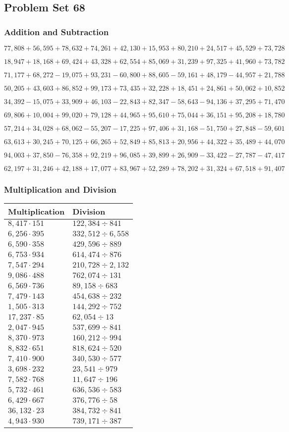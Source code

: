 \hypertarget{problem-set-68}{%
\subsection{Problem Set 68}\label{problem-set-68}}

\hypertarget{addition-and-subtraction-290}{%
\subsubsection{Addition and
Subtraction}\label{addition-and-subtraction-290}}

\(77,808+56,595+78,632+74,261+42,130+15,953+80,210+24,517+45,529+ 73,728\)

\(18,947+18,168+69,424+43,328+62,554+85,069+31,239+97,325+41,960+73,782\)

\(71,177+68,272-19,075+93,231-60,800+88,605-59,161+48,179-44,957+21,788\)

\(50,205+43,603+86,852+99,173+73,435+32,228+18,451+24,861+50,062+10,852\)

\(34,392-15,075+33,909+46,103-22,843+82,347-58,643-94,136+37,295+71,470\)

\(69,806+10,004+99,020+79,128+44,965+95,610+75,044+36,151+95,208+18,780\)

\(57,214+34,028+68,062-55,207-17,225+97,406+31,168-51,750+27,848-59,601\)

\(63,613+30,245+70,125+66,265+52,849+85,813+20,956+44,322+35,489+44,070\)

\(94,003+37,850-76,358+92,219+96,085+39,899+26,909-33,422-27,787-47,417\)

\(62,197+31,246+42,188+17,077+83,967+52,289+78,202+31,324+67,518+91,407\)

\hypertarget{multiplication-and-division-289}{%
\subsubsection{Multiplication and
Division}\label{multiplication-and-division-289}}

\begin{longtable}[]{@{}ll@{}}
\toprule
Multiplication & Division\tabularnewline
\midrule
\endhead
\(8,417\cdot151\) & \(122,384÷841\)\tabularnewline
\(6,256\cdot395\) & \(332,512÷6,558\)\tabularnewline
\(6,590\cdot358\) & \(429,596÷889\)\tabularnewline
\(6,753\cdot934\) & \(614,474÷876\)\tabularnewline
\(7,547\cdot294\) & \(210,728÷2,132\)\tabularnewline
\(9,086\cdot488\) & \(762,074÷131\)\tabularnewline
\(6,569\cdot736\) & \(89,158÷683\)\tabularnewline
\(7,479\cdot143\) & \(454,638÷232\)\tabularnewline
\(1,505\cdot313\) & \(144,292÷752\)\tabularnewline
\(17,237\cdot85\) & \(62,054÷13\)\tabularnewline
\(2,047\cdot945\) & \(537,699÷841\)\tabularnewline
\(8,370\cdot973\) & \(160,212÷994\)\tabularnewline
\(8,832\cdot651\) & \(818,624÷520\)\tabularnewline
\(7,410\cdot900\) & \(340,530÷577\)\tabularnewline
\(3,698\cdot232\) & \(23,541÷979\)\tabularnewline
\(7,582\cdot768\) & \(11,647÷196\)\tabularnewline
\(5,732\cdot461\) & \(636,536÷583\)\tabularnewline
\(6,429\cdot667\) & \(376,776÷58\)\tabularnewline
\(36,132\cdot23\) & \(384,732÷841\)\tabularnewline
\(4,943\cdot930\) & \(739,171÷387\)\tabularnewline
\bottomrule
\end{longtable}


